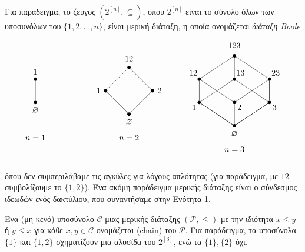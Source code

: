 \documentclass[12pt,a4paper,reqno]{amsart}
\theoremstyle{definition}
\theoremstyle{remark}
\numberwithin{theorem}{section}
\numberwithin{exercise}{section}
\numberwithin{equation}{section}
\newcommand{\cC}{\mathcal{C}}
\newcommand{\pP}{\mathcal{P}}
\renewcommand{\emptyset}{\varnothing}
\newcommand{\defn}[1]{{\color{mylightblue}{#1}}}
\begin{document}
Για παράδειγμα, το ζεύγος $(2^{[n]},\subseteq)$, όπου $2^{[n]}$ είναι το σύνολο όλων των υποσυνόλων του $\{1, 2, \dots, n\}$, είναι μερική διάταξη, η οποία ονομάζεται \emph{διάταξη Boole}
\[
\begin{tikzpicture}[every node/.style={circle, fill, inner sep=1.5pt}]
    \begin{scope}[shift={(0,0.5)}]
    
    \node[label=above:{$1$}] (b) at (0,.5) {};
    \node[label=below:{$\emptyset$}] (a) at (0,-0.5) {};
    \node[below=0.5cm,fill=none] at (0,-1) {$n=1$};

    \draw (a) -- (b);
    \end{scope}

    \begin{scope}[shift={(3,.5)}] 
    \node[label=above:{$12$}] (12) at (1,1) {};
    \node[label=left:{$1$}] (1) at (0,0) {};
    \node[label=right:{$2$}] (2) at (2,0) {};
    \node[label=below:{$\emptyset$}] (0) at (1,-1) {};
    \node[below=0.5cm,fill=none] at (1,-1) {$n=2$};

    \draw (12) -- (1);
    \draw (12) -- (2);
    \draw (1) -- (0);
    \draw (2) -- (0);
    \end{scope}

    \begin{scope}[shift={(7,0)}] 
        \node[label=below left:{$1$}] (a1) at (0,0) {};
        \node[label=below right:{$2$}] (b1) at (1.5,0) {};
        \node[label=below right:{$3$}] (c1) at (3,0) {};
        \node[label=above left:{$12$}] (ab1) at (0,1) {};
        \node[label=above right:{$13$}] (ac1) at (1.5,1) {};
        \node[label=above right:{$23$}] (bc1) at (3,1) {};
        \node[label=above:{$123$}] (abc1) at (1.5,2) {};
        \node[label=below:{$\emptyset$}] (ee1) at (1.5,-1) {};
        \node[below=0.5cm,fill=none] at (1.5,-1) {$n=3$};

        \draw (abc1) -- (ab1) -- (a1) -- (ee1);
        \draw (abc1) -- (bc1) -- (c1) -- (ee1);
        \draw (abc1) -- (ac1) -- (a1) -- (ee1);
        \draw (ab1) -- (b1) -- (ee1);
        \draw (ac1) -- (c1);
        \draw (bc1) -- (b1);
        \draw (bc1) -- (c1) -- (ee1);
    \end{scope}
\end{tikzpicture}
\]
όπου δεν συμπεριλάβαμε τις αγκύλες για λόγους απλότητας (για παράδειγμα, με $12$ συμβολίζουμε το $\{1, 2\}$). Ένα ακόμη παράδειγμα μερικής διάταξης είναι ο σύνδεσμος ιδεωδών ενός δακτύλιου, που συναντήσαμε στην Ενότητα 1.

Ένα (μη κενό) υποσύνολο $\cC$ μιας μερικής διάταξης $(\pP,\leq)$ με την ιδιότητα $x \leq y$ ή $y \le x$ για κάθε $x, y \in \cC$ ονομάζεται \defn{αλυσίδα} (chain) του $\pP$. Για παράδειγμα, τα υποσύνολα $\{1\}$ και $\{1,2\}$ σχηματίζουν μια αλυσίδα του $2^{[3]}$, ενώ τα $\{1\}, \{2\}$ όχι. 
\end{document}
